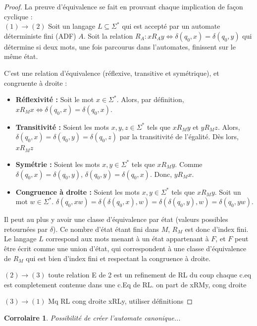 \documentclass[french,letterpaper, 12pt]{article}
\newtheorem{corollary}{Corrolaire}[theorem]
\newtheorem{proof}{Preuve}[theorem]
\begin{document}
	\begin{proof}La preuve d'équivalence se fait en prouvant chaque implication de façon cyclique :\\
		
		$(1)\rightarrow(2)$ Soit un langage $L \subseteq \Sigma^*$ qui est accepté par un automate déterministe fini (ADF) $A$. Soit la relation $R_A : xR_Ay \Leftrightarrow \delta(q_0, x) = \delta(q_0, y)$ qui détermine si deux mots, une fois parcourus dans l'automates, finissent sur le même état.
		
		C'est une relation d'équivalence (réflexive, transitive et symétrique), et congruente à droite :
		
		\begin{itemize}
			\item \textbf{Réflexivité :} Soit le mot $x \in \Sigma^*$. Alors, par définition, $xR_Mx \Leftrightarrow \delta(q_0, x) = \delta(q_0, x)$.
			\item \textbf{Transitivité :} Soient les mots $x,y,z \in \Sigma^*$ tels que $xR_My$ et $yR_Mz$. Alors, $\delta(q_0, x) = \delta(q_0, y) = \delta(q_0, z)$ par la transitivité de l'égalité. Dès lors, $xR_Mz$
			\item \textbf{Symétrie : } Soient les mots $x,y \in \Sigma^*$ tels que $xR_My$. Comme $\delta(q_0, x) = \delta(q_0, y)$, $\delta(q_0, y) = \delta(q_0, x)$. Donc, $yR_Mx$.
			\item \textbf{Congruence à droite :} Soient les mots $x,y \in \Sigma^*$ tels que $xR_My$. Soit un mot $w \in \Sigma^*$. $\delta(q_0, xw) = \delta(\delta(q_0,x), w) = \delta(\delta(q_0,y), w) = \delta(q_0, yw)$.
		\end{itemize}
		
		Il peut au plus y avoir une classe d'équivalence par état (valeurs possibles retournées par $\delta$). Ce nombre d'état étant fini dans $M$, $R_M$ est donc d'index fini. Le langage $L$ correspond aux mots menant à un état appartenant à $F$, et $F$ peut être  écrit comme une union d'état, qui correspondent à une classe d'équivalence de $R_M$ qui est bien d'index fini et respectant la congruence à droite.
		
		
		$(2)\rightarrow(3)$ toute relation E de 2 est un refinement de RL du coup chaque c.eq est completement contenue dans une c.Eq de RL. on part de xRMy, cong droite
		
		$(3)\rightarrow(1)$ Mq RL cong droite xRLy, utiliser définitions 
	\end{proof}


	\begin{corollary}
		Possibilité de créer l'automate canonique...
	\end{corollary}
\end{document}
